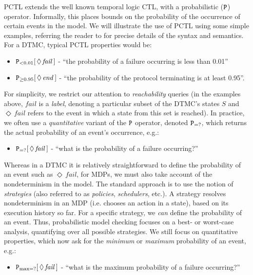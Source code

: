 \documentclass{llncs}
\begin{document}
PCTL extends the well known temporal logic CTL, with a probabilistic ($\tt P$) operator.
Informally, this places bounds on the probability of the occurrence of certain events in the model.
We will illustrate the use of PCTL using some simple examples,
referring the reader to \cite{HJ94,KNP07a} for precise details of the syntax and semantics.
For a DTMC, typical PCTL properties would be:
\begin{itemize}
\item ${\tt P}_{<0.01}[\,\Diamond\,\mathit{fail}\,]$ -
``the probability of a failure occurring is less than 0.01''
\item ${\tt P}_{\geq 0.95}[\,\Diamond\,\mathit{end}\,]$ -
``the probability of the protocol terminating is at least 0.95''.
\end{itemize}
For simplicity, we restrict our attention to \emph{reachability} queries
(in the examples above, $\mathit{fail}$ is a \emph{label}, denoting a particular subset of the DTMC's states $S$
and $\Diamond\,\mathit{fail}$ refers to the event in which a state from this set is reached).
%
In practice, we often use a \emph{quantitative} variant of the ${\tt P}$ operator,
denoted ${\tt P}_{=?}$, which returns the actual probability of an event's occurrence, e.g.:
\begin{itemize}
\item ${\tt P}_{=?}[\,\Diamond\,\mathit{fail}\,]$ -
``what is the probability of a failure occurring?''
\end{itemize}
Whereas in a DTMC it is relatively straightforward to define the probability
of an event such as $\Diamond\,\mathit{fail}$,
for MDPs, we must also take account of the nondeterminism in the model.
The standard approach is to use the notion of
\emph{strategies} (also referred to as \emph{policies}, \emph{schedulers}, etc.).
A strategy resolves nondeterminism in an MDP (i.e. chooses an action in a state),
based on its execution history so far.
For a specific strategy, we \emph{can} define the probability of an event.
Thus, probabilistic model checking focuses on a best- or worst-case analysis,
quantifying over all possible strategies.
We still focus on quantitative properties,
which now ask for the \emph{minimum} or \emph{maximum} probability of an event, e.g.:
\begin{itemize}
\item ${\tt P}_{\max=?}[\,\Diamond\,\mathit{fail}\,]$ -
``what is the maximum probability of a failure occurring?''
\end{itemize}
\end{document}
